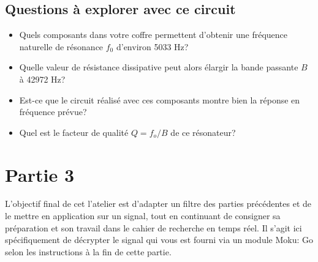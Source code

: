 \documentclass[canadien,12pt,oneside,letterpaper]{article}
\begin{document}
\subsection{Questions à explorer avec ce circuit}
\begin{itemize}
    \item Quels composants dans votre coffre permettent d'obtenir une fréquence naturelle de résonance $f_0$ d'environ 5033 Hz? %
    \item Quelle valeur de résistance dissipative peut alors élargir la bande passante $B$ à 42972 Hz? %
    \item Est-ce que le circuit réalisé avec ces composants montre bien la réponse en fréquence prévue? %
    \item Quel est le facteur de qualité $Q=f_o/B$ de ce résonateur? %
\end{itemize}

\section{Partie 3}\label{sec:filtrage-source}
 L'objectif final de cet l'atelier est d'adapter un filtre des parties précédentes et de le mettre en application sur un signal, tout en continuant de consigner sa préparation et son travail dans le cahier de recherche en temps réel. Il s'agit ici spécifiquement de décrypter le signal qui vous est fourni via un module Moku: Go selon les instructions à la fin de cette partie. 
\end{document}
